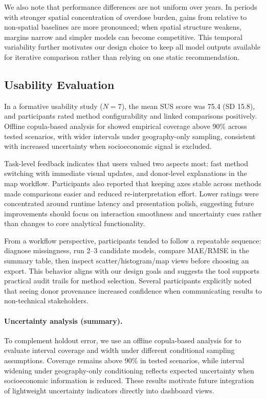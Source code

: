 We also note that performance differences are not uniform over years. In periods with stronger spatial concentration of overdose burden, gains from \gknn relative to non-spatial baselines are more pronounced; when spatial structure weakens, margins narrow and simpler models can become competitive. This temporal variability further motivates our design choice to keep all model outputs available for iterative comparison rather than relying on one static recommendation.

\subsection{Usability Evaluation}
In a formative usability study (\(N=7\)), the mean SUS score was 75.4 (SD 15.8), and participants rated method configurability and linked comparisons positively. Offline copula-based analysis for \gknn showed empirical coverage above 90\% across tested scenarios, with wider intervals under geography-only sampling, consistent with increased uncertainty when socioeconomic signal is excluded.

Task-level feedback indicates that users valued two aspects most: fast method switching with immediate visual updates, and donor-level explanations in the map workflow. Participants also reported that keeping axes stable across methods made comparisons easier and reduced re-interpretation effort. Lower ratings were concentrated around runtime latency and presentation polish, suggesting future improvements should focus on interaction smoothness and uncertainty cues rather than changes to core analytical functionality.

From a workflow perspective, participants tended to follow a repeatable sequence: diagnose missingness, run 2--3 candidate models, compare MAE/RMSE in the summary table, then inspect scatter/histogram/map views before choosing an export. This behavior aligns with our design goals and suggests the tool supports practical audit trails for method selection. Several participants explicitly noted that seeing donor provenance increased confidence when communicating results to non-technical stakeholders.

\paragraph*{Uncertainty analysis (summary).}
To complement holdout error, we use an offline copula-based analysis for \gknn to evaluate interval coverage and width under different conditional sampling assumptions. Coverage remains above 90\% in tested scenarios, while interval widening under geography-only conditioning reflects expected uncertainty when socioeconomic information is reduced. These results motivate future integration of lightweight uncertainty indicators directly into dashboard views.

